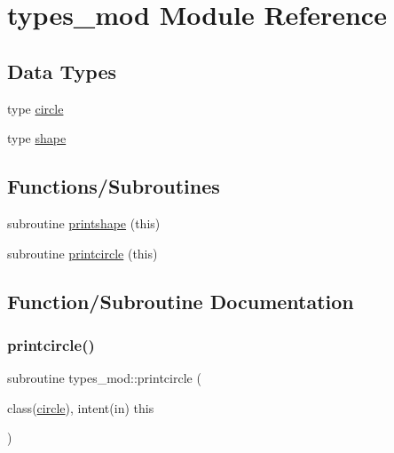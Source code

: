 \hypertarget{namespacetypes__mod}{}\section{types\+\_\+mod Module Reference}
\label{namespacetypes__mod}
\subsection*{Data Types}
\begin{DoxyCompactItemize}
\item 
type \hyperlink{structtypes__mod_1_1circle}{circle}
\item 
type \hyperlink{structtypes__mod_1_1shape}{shape}
\end{DoxyCompactItemize}
\subsection*{Functions/\+Subroutines}
\begin{DoxyCompactItemize}
\item 
subroutine \hyperlink{namespacetypes__mod_ab09448209b0b127b46bc8fa8bf29b739}{printshape} (this)
\item 
subroutine \hyperlink{namespacetypes__mod_ae45a0e69dfbf27364378a9d1e7f71f99}{printcircle} (this)
\end{DoxyCompactItemize}


\subsection{Function/\+Subroutine Documentation}
\mbox{\label{namespacetypes__mod_ae45a0e69dfbf27364378a9d1e7f71f99}} 
\subsubsection{\texorpdfstring{printcircle()}{printcircle()}}
{\footnotesize\ttfamily subroutine types\+\_\+mod\+::printcircle (\begin{DoxyParamCaption}\item[{class(\hyperlink{structtypes__mod_1_1circle}{circle}), intent(in)}]{this }\end{DoxyParamCaption})\hspace{0.3cm}{\ttfamily [private]}}



